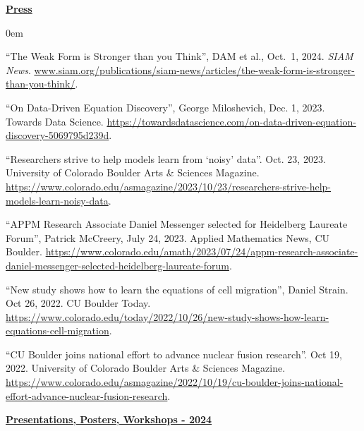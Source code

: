 \documentclass[letterpaper,11pt,oneside]{article}
\newcommand{\headr}[1]{\uline{\Large{\textbf{#1}} \hfill } \\ \vspace{-0.5cm}}
\begin{document}
\headr{Press}
\begin{sloppypar}
\begin{enumerate}[label={[\arabic*]}]
\itemsep0em 
\item 
\raggedright``The Weak Form is Stronger than you Think'', DAM et al., Oct.\ 1, 2024. {\it SIAM News}. {\footnotesize\url{www.siam.org/publications/siam-news/articles/the-weak-form-is-stronger-than-you-think/}}.
\item 
\raggedright``On Data-Driven Equation Discovery'', George Miloshevich, Dec. 1, 2023. Towards Data Science. {\footnotesize\url{https://towardsdatascience.com/on-data-driven-equation-discovery-5069795d239d}}.
\item 
\raggedright``Researchers strive to help models learn from ‘noisy’ data''. Oct. 23, 2023. University of Colorado Boulder Arts \& Sciences Magazine. {\footnotesize\url{https://www.colorado.edu/asmagazine/2023/10/23/researchers-strive-help-models-learn-noisy-data}}.
\item 
\raggedright``APPM Research Associate Daniel Messenger selected for Heidelberg Laureate Forum'', Patrick McCreery, July 24, 2023. Applied Mathematics News, CU Boulder. {\footnotesize\url{https://www.colorado.edu/amath/2023/07/24/appm-research-associate-daniel-messenger-selected-heidelberg-laureate-forum}}.
\item \raggedright``New study shows how to learn the equations of cell migration'', Daniel Strain. Oct 26, 2022. CU Boulder Today. {\footnotesize\url{https://www.colorado.edu/today/2022/10/26/new-study-shows-how-learn-equations-cell-migration}}.
\item 
\raggedright``CU Boulder joins national effort to advance nuclear fusion research''. Oct 19, 2022. University of Colorado Boulder Arts \& Sciences Magazine. {\footnotesize\url{https://www.colorado.edu/asmagazine/2022/10/19/cu-boulder-joins-national-effort-advance-nuclear-fusion-research}}.
\end{enumerate}
\end{sloppypar}

\headr{Presentations, Posters, Workshops - 2024}
\end{document}
